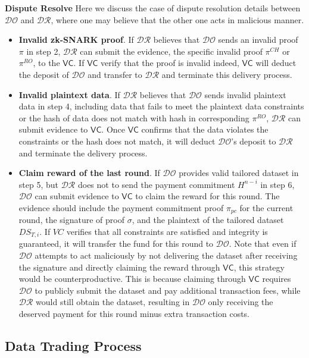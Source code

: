 \documentclass[journal]{IEEEtran}
\begin{document}
\textbf{Dispute Resolve}
Here we discuss the case of dispute resolution details between $\mathcal{DO}$ and $\mathcal{DR}$, where one may believe that the other one acts in malicious manner.
\begin{itemize}
    \item \textbf{Invalid zk-SNARK proof}. If $\mathcal{DR}$ believes that $\mathcal{DO}$ sends an invalid proof $\pi$ in step 2, $\mathcal{DR}$ can submit the evidence, the specific invalid proof $\pi^{CH}$ or $\pi^{RO}$, to the $\mathsf{VC}$. If $\mathsf{VC}$ verify that the proof is invalid indeed, $\mathsf{VC}$ will deduct the deposit of $\mathcal{DO}$ and transfer to $\mathcal{DR}$ and terminate this delivery process.
    \item \textbf{Invalid plaintext data}. If $\mathcal{DR}$ believes that $\mathcal{DO}$ sends invalid plaintext data in step 4, including data that fails to meet the plaintext data constraints or the hash of data does not match with hash in corresponding $\pi^{RO}$, $\mathcal{DR}$ can submit evidence to $\mathsf{VC}$. Once $\mathsf{VC}$ confirms that the data violates the constraints or the hash does not match, it will deduct $\mathcal{DO}$'s deposit to $\mathcal{DR}$ and terminate the delivery process.
    \item \textbf{Claim reward of the last round}. If $\mathcal{DO}$ provides valid tailored dataset in step 5, but $\mathcal{DR}$ does not to send the payment commitment $H^{n-i}$ in step 6, $\mathcal{DO}$ can submit evidence to $\mathsf{VC}$ to claim the reward for this round. The evidence should include the payment commitment proof $\pi_{pc}$ for the current round, the signature of proof $\sigma$, and the plaintext of the tailored dataset $DS_{T,i}$. If $VC$ verifies that all constraints are satisfied and integrity is guaranteed, it will transfer the fund for this round to $\mathcal{DO}$.  Note that even if $\mathcal{DO}$ attempts to act maliciously by not delivering the dataset after receiving the signature and directly claiming the reward through $\mathsf{VC}$, this strategy would be counterproductive. This is because claiming through $\mathsf{VC}$ requires $\mathcal{DO}$ to publicly submit the dataset and pay additional transaction fees, while $\mathcal{DR}$ would still obtain the dataset, resulting in $\mathcal{DO}$ only receiving the deserved payment for this round minus extra transaction costs.
\end{itemize}

\subsection{Data Trading Process}\label{subsec:data_delivery_verfication}
\end{document}
